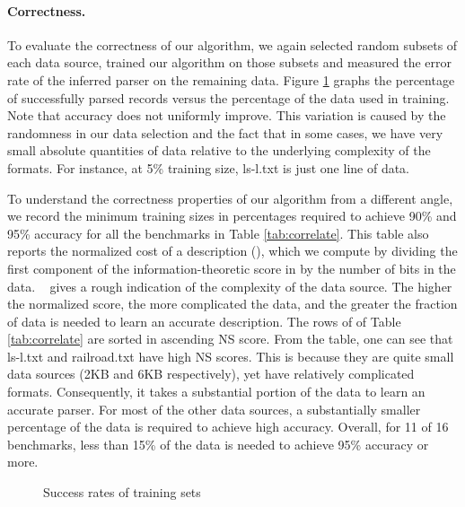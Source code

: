 \paragraph*{Correctness.}
To evaluate the correctness of our algorithm, we again selected
random subsets of each data source, trained our algorithm on those subsets and
measured the error rate of the inferred parser on the remaining data.
Figure \ref{fig:trainsucc} graphs the percentage of successfully parsed records
versus the percentage of the data used in training.  Note
that accuracy does not uniformly improve.  This variation is caused by the
randomness in our data selection and the fact that in some cases,
we have very small absolute quantities of data relative to the
underlying complexity of the formats.   
For instance, at 5\% training size, ls-l.txt is just one line of data.

To understand the correctness properties of our algorithm from a different angle,
we record the minimum training sizes in percentages required to achieve 90\% and 95\% accuracy for
all the benchmarks in Table \ref{tab:correlate}.  This table also reports the
normalized cost of a description (\normcostdescription), which we compute by dividing the
first component of the information-theoretic score in  
by the number of bits in the data.  \normcostdescription~ gives
a rough indication of the complexity of the data source. The higher the
normalized score, the more complicated the data, and the greater the fraction of data is
needed to learn an accurate description.  The rows of of Table \ref{tab:correlate}
are sorted in ascending NS score.  From the table, one can see that ls-l.txt and
railroad.txt have high NS scores.  This is because they are quite small data sources
(2KB and 6KB respectively), yet have relatively complicated formats.  Consequently,
it takes a substantial portion of the data to learn an accurate parser.  For most of the other
data sources, a substantially smaller percentage of the data is required to achieve
high accuracy.  Overall, for 11 of 16 benchmarks, less than
15\% of the data is needed to achieve 95\% accuracy or more.

\begin{figure}
\caption{Success rates of training sets} \label{fig:trainsucc} \shrink
\end{figure}

